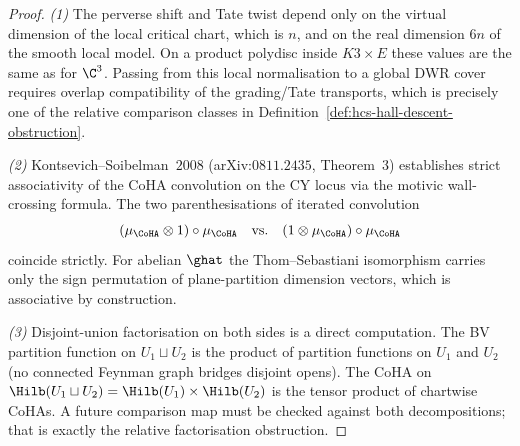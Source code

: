 \begin{proof}
\emph{(1)} The perverse shift and Tate twist depend only on the
virtual dimension of the local critical chart, which is $n$, and on the
real dimension $6n$ of the smooth local model. On a product polydisc
inside $K3\times E$ these values are the same as for $\C^3$. Passing
from this local normalisation to a global DWR cover requires overlap
compatibility of the grading/Tate transports, which is precisely one of
the relative comparison classes in
Definition~\ref{def:hcs-hall-descent-obstruction}.

\emph{(2)} Kontsevich--Soibelman~$2008$
\textup{(}arXiv:$0811.2435$, Theorem~$3$\textup{)} establishes strict
associativity of the CoHA convolution on the CY locus via the motivic
wall-crossing formula. The two parenthesisations of iterated
convolution
\[
(\mu_{\CoHA}\otimes 1)\circ\mu_{\CoHA}
\quad\text{vs.}\quad
(1\otimes\mu_{\CoHA})\circ\mu_{\CoHA}
\]
coincide strictly. For abelian $\ghat$ the Thom--Sebastiani
isomorphism carries only the sign permutation of plane-partition
dimension vectors, which is associative by construction.

\emph{(3)} Disjoint-union factorisation on both sides is a direct
computation. The BV partition function on $U_1\sqcup U_2$ is the
product of partition functions on $U_1$ and $U_2$ (no connected
Feynman graph bridges disjoint opens). The CoHA on
$\Hilb(U_1\sqcup U_2)=\Hilb(U_1)\times\Hilb(U_2)$ is the tensor
product of chartwise CoHAs. A future comparison map must be checked
against both decompositions; that is exactly the relative
factorisation obstruction.
\end{proof}

